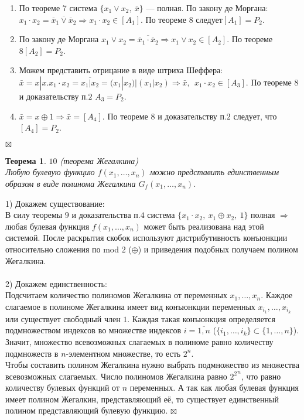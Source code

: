 \documentclass[a4paper, 12pt]{report}
\newenvironment{Proof} %
{\par\noindent{$\blacklozenge$}} %
{\hfill$\scriptstyle\boxtimes$} %
\newtheorem*{theorem}{Теорема} %
\begin{document}
\begin{Proof}
\begin{enumerate}
    \item 	По теореме 7 система $\{x_1 \vee x_2,~ \bar x\}$ — полная. По закону де Моргана: $x_1\cdot x_2 = \overline{\overline{x}_1 \vee \overline{x}_2} \Rightarrow x_1\cdot x_2 \in [A_1]$. По теореме 8 следует$[A_1] = P_2$.
\item	По закону де Моргана $x_1 \vee x_2 = \overline{\overline{x}_1 \cdot \overline{x}_2} \Rightarrow x_1\vee x_2 \in [A_2]$. По теореме $8 [A_2] = P_2$.
\item	Можем представить отрицание в виде штриха Шеффера: $\bar x =x|x. x_1 \cdot x_2 = \overline{x_1|x_2} = (x_1|x_2) | (x_1|x_2) \Rightarrow \bar x, ~~ x_1\cdot x_2 \in [A_3]$. По теореме $8$ и доказательству п.$2$ $A_3 = P_2$.
\item	$\bar x = x\oplus 1 \Rightarrow \bar x = [A_4]$. По теореме $8$ и доказательству п.$2$ следует, что $[A_4] = P_2$.
\end{enumerate}
\end{Proof}	
\begin{theorem}$10$ (теорема Жегалкина)\\
Любую булевую функцию $f(x_1, \dotso, x_n)$ можно представить единственным образом в виде полинома Жегалкина $G_f(x_1, \dotso, x_n)$.
\end{theorem}
\begin{Proof}
1) Докажем существование:\\
В силу теоремы $9$ и доказательства п.$4$ система $\{x_1 \cdot x_2, ~x_1\oplus x_2, ~1\}$ полная $\Rightarrow$ любая булевая функция $f(x_1, \dotso, x_n)$ может быть реализована над этой системой. После раскрытия скобок используют дистрибутивность конъюнкции относительно сложения по mod $2$ ($\oplus$) и приведения подобных получаем полином Жегалкина.\\\\
2) Докажем единственность:\\
Подсчитаем количество полиномов Жегалкина от переменных $x_1, \dotso, x_n$. Каждое слагаемое в полиноме Жегалкина имеет вид конъюнкции переменных $x_{i_{1}},\dotso,x_{i_{k}}$ или существует свободный член $1$. Каждая такая конъюнкция определяется подмножеством индексов во множестве индексов $i = \overline{1, n}$ ($\{ i_1, \dotso, i_k\} \subset \{1, \dotso, n\}$). Значит, множество всевозможных слагаемых в полиноме равно количеству подмножеств в $n$-элементном множестве, то есть $2^n$.\\
Чтобы составить полином Жегалкина нужно выбрать подмножество из множества всевозможных слагаемых. Число полиномов Жегалкина равно ${2^2}^n$, что равно количеству булевых функций от $n$ переменных. А так как любая булевая функция имеет полином Жегалкин, представляющий её, то существует единственный полином представляющий булевую функцию.
\end{Proof}\\\\
\end{document}
